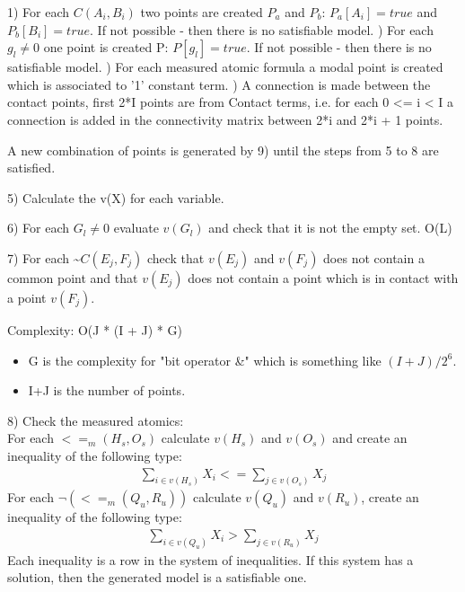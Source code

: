\documentclass{article}
\begin{document}
			1)  For each $C(A_i, B_i)$ two points are created $P_a$ and $P_b$: $P_a[A_i] = true$ and $P_b[B_i] = true$.
				If not possible - then there is no satisfiable model.
			\newline
			) For each $g_l \neq 0$ one point is created P: $P[g_l] = true$.
				If not possible - then there is no satisfiable model.
			\newline
			) For each measured atomic formula a modal point is created which is associated to '1' constant term.
			\newline
			) A connection is made between the contact points, first 2*I points are from Contact terms,
				 i.e. for each 0 <= i < I a connection is added in the connectivity matrix between 2*i and 2*i + 1 points. %
			\newline
			
			A new combination of points is generated by 9) until the steps from 5 to 8 are satisfied.
			\newline

			5) Calculate the v(X) for each variable. %
			\newline

			6) For each $G_l \neq 0$ evaluate $v(G_l)$ and check that it is not the empty set. O(L)
			\newline

			7) For each \textasciitilde $C(E_j, F_j)$ check that $v(E_j)$ and $v(F_j)$ does not contain a common point and that $v(E_j)$ does not contain a point which is in contact with a point $v(F_j)$.
			\newline

			Complexity: O(J * (I + J) * G)
			\begin{itemize}
				\item G is the complexity for "bit operator \&" which is something like $(I+J)/2^6$.
				\item I+J is the number of points.
			\end{itemize}
			
			8) Check the measured atomics: \\%

			For each $<=_m(H_s, O_s)$ calculate $v(H_s)$ and $v(O_s)$ and create an inequality of the following type: 
			\begin{align*}
				\sum_{i \in v(H_s)} X_i <= \sum_{j \in v(O_s)} X_j
			\end{align*}
			For each $\neg (<=_m(Q_u, R_u) )$ calculate $v(Q_u)$ and $v(R_u)$, create an inequality of the following type: 
			\begin{align*}
				\sum_{i \in v(Q_u)} X_i > \sum_{j \in v(R_u)} X_j
			\end{align*}
			Each inequality is a row in the system of inequalities. 
			If this system has a solution, then the generated model is a satisfiable one. \\ %
			
\end{document}

